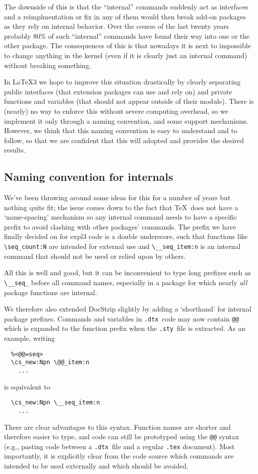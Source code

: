 \documentclass{ltnews}
\def\DTX{\texttt{.dtx}}
\def\STY{\texttt{.sty}}
\begin{document}
The downside of this is that the ``internal'' commands suddenly act as
interfaces and a reimplmentation or fix in any of them would then
break add-on packages as they rely on internal behavior. Over the
course of the last twenty years probably 80\% of such ``internal''
commands have found their way into one or the other package.  The
consequences of this is that nowadays it is next to impossible to
change anything in the \LaTeXe{} kernel (even if it is clearly just an
internal command) without breaking something.
 

In \LaTeX3 we hope to improve this situation drastically by
clearly separating public interfaces (that extension packages can use
and rely on) and private functions and variables (that should not
appear outside of their module).  There is (nearly) no way to enforce
this without severe computing overhead, so we implement it only
through a naming convention, and some support mechanisms.  However, we
think that this naming convention is easy to understand and to follow,
so that we are confident that this will adopted and provides the
desired results.

\subsection{Naming convention for internals}

We've been throwing around some ideas for this for a number of years but nothing quite fit; the issue comes down to the fact that \TeX\ does not have a `name-spacing' mechanism so any internal command needs to have a specific prefix to avoid clashing with other packages' commands.
The prefix we have finally decided on for \textsf{expl3} code is a double underscore, such that functions like \verb|\seq_count:N| are intended for external use and \verb|\__seq_item:n| is an internal command that should not be used or relied upon by others.

All this is well and good, but it can be inconvenient to type long prefixes such as \verb|\__seq_| before all command names, especially in a package for which nearly \emph{all} package functions are internal.

We therefore also extended \textsf{DocStrip} slightly by adding  a `shorthand' for internal package prefixes.
Commands and variables in \DTX\ code may now contain \texttt{@@} which is expanded to the function prefix when the \STY\ file is extracted.
As an example, writing
\begin{verbatim}
  %<@@=seq>
  \cs_new:Npn \@@_item:n
    ...
\end{verbatim}
is equivalent to
\begin{verbatim}
  \cs_new:Npn \__seq_item:n
    ...
\end{verbatim}
There are clear advantages to this syntax.
Function names are shorter and therefore easier to type, and code can still be prototyped using the \texttt{@@} syntax
(e.g., pasting code between a \DTX\ file and a regular \texttt{.tex} document).
Most importantly, it is explicitly clear from the code source which commands are intended to be used externally and which should be avoided.
\end{document}
